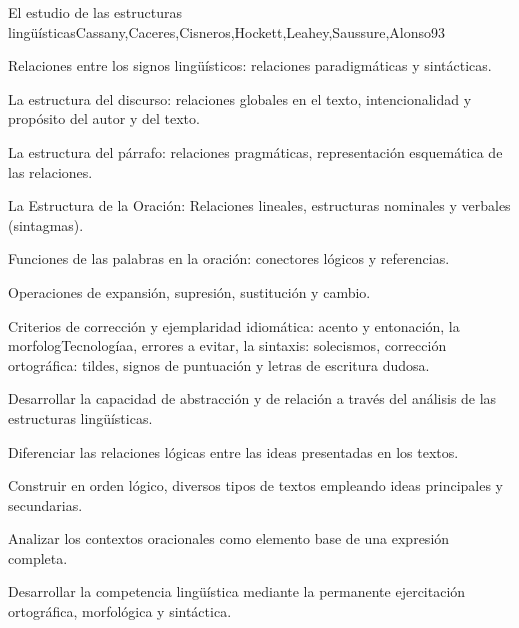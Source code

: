 \begin{syllabus}
\begin{unit}{El estudio de las estructuras lingüísticas}{Cassany,Caceres,Cisneros,Hockett,Leahey,Saussure,Alonso}{9}{3}
\begin{topics}
   \item Relaciones entre los signos lingüísticos: relaciones paradigmáticas y sintácticas.
   \item La estructura del discurso: relaciones globales en el texto, intencionalidad y propósito del autor y del texto. 
   \item La estructura del párrafo: relaciones pragmáticas, representación esquemática de las relaciones. 
   \item La Estructura de la Oración: Relaciones lineales, estructuras nominales y verbales (sintagmas).
   \item Funciones de las palabras en la oración: conectores lógicos y referencias.
   \item Operaciones de expansión, supresión, sustitución y cambio.
   \item Criterios de corrección y ejemplaridad idiomática: acento y entonación, la morfologTecnologíaa, errores a evitar, la sintaxis: solecismos, corrección ortográfica: tildes, signos de puntuación y letras de escritura dudosa.
\end{topics}

\begin{unitgoals}
   \item Desarrollar la capacidad de abstracción y de relación a través del análisis de las estructuras lingüísticas.
   \item Diferenciar las relaciones lógicas entre las ideas presentadas en los textos.
   \item Construir en orden lógico, diversos tipos de textos empleando ideas principales y secundarias.
   \item Analizar los contextos oracionales como elemento base de una expresión completa.
   \item Desarrollar la competencia lingüística mediante la permanente ejercitación ortográfica, morfológica y sintáctica.
\end{unitgoals}
\end{unit}


\end{syllabus}
